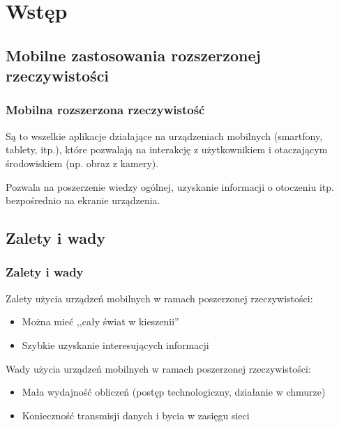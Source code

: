\section{Wstęp}
\nextoc 

\subsection{Mobilne zastosowania rozszerzonej rzeczywistości}
\begin{frame}
    \frametitle{Mobilna rozszerzona rzeczywistość}

    Są to wszelkie aplikacje działające na urządzeniach mobilnych (smartfony, tablety, itp.), które pozwalają na interakcję z użytkownikiem i otaczającym środowiskiem (np. obraz z kamery).

    Pozwala na poszerzenie wiedzy ogólnej, uzyskanie informacji o otoczeniu itp. bezpośrednio na ekranie urządzenia.
\end{frame}

\subsection{Zalety i wady}
\begin{frame}
    \frametitle{Zalety i wady}
    Zalety użycia urządzeń mobilnych w ramach poszerzonej rzeczywistości:
    \begin{itemize}
        \item Można mieć ,,cały świat w kieszenii''
        \item Szybkie uzyskanie interesujących informacji
    \end{itemize}
    Wady użycia urządzeń mobilnych w ramach poszerzonej rzeczywistości:
    \begin{itemize}
        \item Mała wydajność obliczeń (postęp technologiczny, działanie w chmurze)
        \item Konieczność transmisji danych i bycia w zasięgu sieci
    \end{itemize}
\end{frame}

